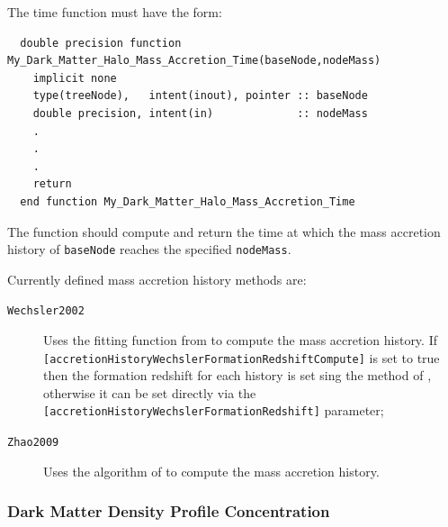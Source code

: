 The time function must have the form:
\begin{verbatim}
  double precision function My_Dark_Matter_Halo_Mass_Accretion_Time(baseNode,nodeMass)
    implicit none
    type(treeNode),   intent(inout), pointer :: baseNode
    double precision, intent(in)             :: nodeMass
    .
    .
    .
    return
  end function My_Dark_Matter_Halo_Mass_Accretion_Time
\end{verbatim}
The function should compute and return the time at which the mass accretion history of {\tt baseNode} reaches the specified {\tt nodeMass}.

Currently defined mass accretion history methods are:
\begin{description}
 \item [{\tt Wechsler2002}] Uses the fitting function from \cite{wechsler_concentrations_2002} to compute the mass accretion history. If {\tt [accretionHistoryWechslerFormationRedshiftCompute]} is set to true then the formation redshift for each history is set sing the method of \cite{bullock_profiles_2001}, otherwise it can be set directly via the {\tt [accretionHistoryWechslerFormationRedshift]} parameter;
 \item [{\tt Zhao2009}] Uses the algorithm of \cite{zhao_accurate_2009} to compute the mass accretion history.
\end{description}

\subsubsection{Dark Matter Density Profile Concentration}

